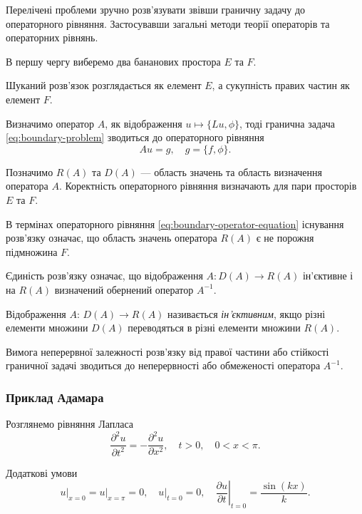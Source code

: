 Перелічені проблеми зручно розв'язувати звівши граничну задачу до операторного рівняння. Застосувавши загальні методи теорії операторів та операторних рівнянь. \medskip

В першу чергу виберемо два бананових простора $E$ та $F$. \medskip

Шуканий розв'язок розглядається як елемент $E$, а сукупність правих частин як елемент $F$. \medskip

Визначимо оператор $A$, як відображення $u \mapsto \{Lu, \phi\}$, тоді гранична задача
\eqref{eq:boundary-problem} зводиться до операторного рівняння
\begin{equation}
    \label{eq:boundary-operator-equation}
    A u = g, \quad g = \{f, \phi\}.
\end{equation}

Позначимо $R(A)$ та $D(A)$ --- область значень та область визначення оператора $A$. Коректність операторного рівняння визначають для пари просторів $E$ та $F$. \medskip

\begin{proposition}
    В термінах операторного рівняння \eqref{eq:boundary-operator-equation} існування розв'язку означає, що область значень оператора $R(A)$ є не порожня підмножина $F$.
\end{proposition}

\begin{proposition}
    Єдиність розв'язку означає, що відображення $A: D(A) \to R(A)$ ін'єктивне і на $R(A)$ визначений обернений оператор $A^{-1}$.
\end{proposition}

\begin{definition}
    Відображення $A$: \allowbreak $D(A) \to R(A)$ називається \textit{ін'єктивним}, якщо різні елементи множини $D(A)$ переводяться в різні елементи множини $R(A)$.    
\end{definition}

\begin{proposition}
    Вимога неперервної залежності розв'язку від правої частини або стійкості граничної задачі зводиться до неперервності або обмеженості оператора $A^{-1}$.
\end{proposition}

\subsubsection{Приклад Адамара}

\begin{example}
    Розглянемо рівняння Лапласа
    \begin{equation}
        \frac{\partial^2 u}{\partial t^2} = - \frac{\partial^2 u}{\partial x^2}, \quad t > 0, \quad 0 < x < \pi.
    \end{equation}

    Додаткові умови
    \begin{equation}
        \left. u \right|_{x = 0} = \left. u \right|_{x = \pi} = 0, \quad \left. u \right|_{t = 0} = 0, \quad \left. \frac{\partial u}{\partial t} \right|_{t = 0} = \frac{\sin (k x)}{k}.
    \end{equation}
\end{example}

